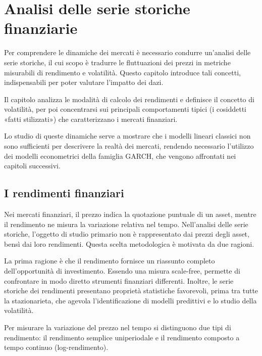\chapter[Analisi delle serie storiche finanziarie]{Analisi delle serie storiche\\ finanziarie}
\label{cap:analisi-serie}

Per comprendere le dinamiche dei mercati è necessario condurre un'analisi delle serie storiche, il cui scopo è tradurre le fluttuazioni dei 
prezzi in metriche misurabili di rendimento e volatilità. Questo capitolo introduce tali concetti, indispensabili per poter valutare l'impatto dei dazi.

Il capitolo analizza le modalità di calcolo dei rendimenti e definisce il concetto di volatilità, per poi concentrarsi sui principali 
comportamenti tipici (i cosiddetti «fatti stilizzati») che caratterizzano i mercati finanziari.

Lo studio di queste dinamiche serve a mostrare che i modelli lineari classici non sono sufficienti per descrivere la realtà dei mercati, 
rendendo necessario l'utilizzo dei modelli econometrici della famiglia GARCH, che vengono affrontati nei capitoli successivi.


\section{I rendimenti finanziari}
Nei mercati finanziari, il prezzo indica la quotazione puntuale di un asset, mentre il rendimento ne misura la variazione relativa nel tempo\cite{libro:investments}. 
Nell'analisi delle serie storiche, l'oggetto di studio primario non è rappresentato dai prezzi degli asset, bensì dai loro rendimenti. 
Questa scelta metodologica è motivata da due ragioni\cite{campbell:econometrics}.

La prima ragione è che il rendimento fornisce un riassunto completo dell'opportunità di investimento. Essendo una misura \gls{scale-free}, 
permette di confrontare in modo diretto strumenti finanziari differenti. 
Inoltre, le serie storiche dei rendimenti presentano proprietà statistiche favorevoli, prima tra tutte la \gls{stazionarieta}, che agevola 
l'identificazione di modelli predittivi e lo studio della volatilità.

Per misurare la variazione del prezzo nel tempo si distinguono due tipi di rendimento: il rendimento semplice uniperiodale e il 
rendimento composto a tempo continuo (log-rendimento).


